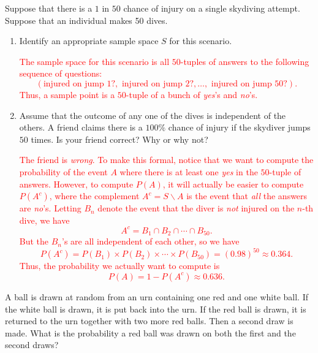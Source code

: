 \documentclass[12pt,reqno]{amsart}
\begin{document}
\bigskip
\prob Suppose that there is a $1$ in $50$ chance of injury on a single skydiving attempt. Suppose that an individual makes 50 dives.

\medskip
\begin{enumerate}
    \item Identify an appropriate sample space $S$ for this scenario.
    
    \bigskip
    \textcolor{red}{The sample space for this scenario is all $50$-tuples of answers to the following sequence of questions:
    \[(\text{injured on jump 1?}, \text{ injured on jump 2?}, \ldots, \text{ injured on jump 50?}).\]
    Thus, a sample point is a $50$-tuple of a bunch of \textit{yes}'s and \textit{no}'s.}
    \bigskip

    \item Assume that the outcome of any one of the dives is independent of the others. A friend claims there is a $100\%$ chance of injury if the skydiver jumps $50$ times. Is your friend correct? Why or why not?
    
    \bigskip
    \textcolor{red}{The friend is \textit{wrong}. To make this formal, notice that  we want to compute the probability of the event $A$ where there is at least one \textit{yes} in the $50$-tuple of answers. However, to compute $P(A)$, it will actually be easier to compute $P(A^c)$, where the complement $A^c = S\smallsetminus A$ is the event that \textit{all} the answers are \textit{no}'s. Letting $B_n$ denote the event that the diver is \textit{not} injured on the $n$-th dive, we have
        \[A^c = B_1 \cap B_2 \cap \cdots \cap B_{50}.\]
    But the $B_n$'s are all independent of each other, so we have
        \[P(A^c) = P(B_1) \times P(B_2) \times \cdots \times P(B_{50}) = (0.98)^{50} \approx 0.364.\]
    Thus, the probability we actually want to compute is
        \[P(A) = 1 - P(A^c) \approx 0.636.\]}
\end{enumerate}

















\bigskip
\prob A ball is drawn at random from an urn containing one red and one white ball. If the white ball is drawn, it is put back into the urn. If the red ball is drawn, it is returned to the urn together with two more red balls. Then a second draw is made. What is the probability a red ball was drawn on both the first and the second draws?
\end{document}
